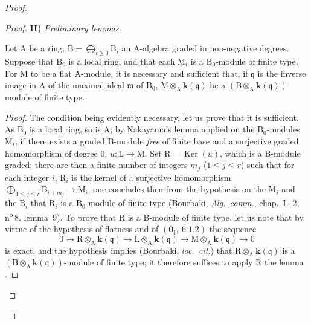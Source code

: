 \begin{proof}
\begin{proof}
\medskip
\noindent\textbf{II)} \emph{Preliminary lemmas.}

\begin{lemma}[11.2.9.3]
\label{IV.11.2.9.3}
Let $\mathrm{A}$ be a ring, $\mathrm{B}=\bigoplus_{i\geqslant 0}\mathrm{B}_i$ an A-algebra graded in non-negative degrees. Suppose that $\mathrm{B}_0$ is a local ring, and that each $\mathrm{M}_i$ is a $\mathrm{B}_0$-module of finite type. For $\mathrm{M}$ to be a flat $\mathrm{A}$-module, it is necessary and sufficient that, if $\mathfrak{q}$ is the inverse image in $\mathrm{A}$ of the maximal ideal $\mathfrak{m}$ of $\mathrm{B}_0$, $\mathrm{M}\otimes_\mathrm{A}\boldsymbol{k}(\mathfrak{q})$ be a $(\mathrm{B}\otimes_\mathrm{A}\boldsymbol{k}(\mathfrak{q}))$-module of finite type.
\end{lemma}


\begin{proof}
The condition being evidently necessary, let us prove that it is sufficient. As $\mathrm{B}_0$ is a local ring, so is $\mathrm{A}$; by Nakayama's lemma applied on the $\mathrm{B}_0$-modules $\mathrm{M}_i$, if there exists a graded B-module \emph{free} of finite base and a surjective graded homomorphism of degree $0$, $u:\mathrm{L}\to\mathrm{M}$. Set $\mathrm{R}=\operatorname{Ker}(u)$, which is a B-module graded; there are then a finite number of integers $m_j$ ($1\leqslant j\leqslant r$) such that for each integer $i$, $\mathrm{R}_i$ is the kernel of a surjective homomorphism $\bigoplus_{1\leqslant j\leqslant r}\mathrm{B}_{i+m_j}\to\mathrm{M}_i$; one concludes then from the hypothesis on the $\mathrm{M}_i$ and the $\mathrm{B}_i$ that $\mathrm{R}_i$ is a $\mathrm{B}_0$-module of finite type (Bourbaki, \emph{Alg.\ comm.}, chap.~I, \textsection\,2, n\textsuperscript{o}\,8, lemma~9). To prove that $\mathrm{R}$ is a B-module of finite type, let us note that by virtue of the hypothesis of flatness and of $(\mathbf{0}_\mathrm{I},~6.1.2)$ the sequence
\[
  0\to\mathrm{R}\otimes_\mathrm{A}\boldsymbol{k}(\mathfrak{q})\to\mathrm{L}\otimes_\mathrm{A}\boldsymbol{k}(\mathfrak{q})\to\mathrm{M}\otimes_\mathrm{A}\boldsymbol{k}(\mathfrak{q})\to 0
\]
is exact, and the hypothesis implies (Bourbaki, \emph{loc.\ cit.}) that $\mathrm{R}\otimes_\mathrm{A}\boldsymbol{k}(\mathfrak{q})$ is a $(\mathrm{B}\otimes_\mathrm{A}\boldsymbol{k}(\mathfrak{q}))$-module of finite type; it therefore suffices to apply $\mathrm{R}$ the lemma .
\end{proof}


\end{proof}
\end{proof}
